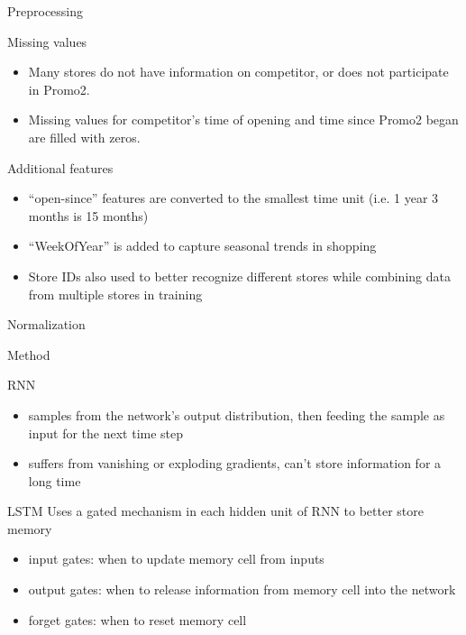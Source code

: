 \documentclass[10pt]{beamer}
\begin{document}
\begin{frame}{Preprocessing}
    \begin{alertblock}{Missing values}
        \begin{itemize}
            \item Many stores do not have information on competitor, or does not participate in Promo2.
            \item Missing values for competitor's time of opening and time since Promo2 began are filled with zeros.
        \end{itemize}
    \end{alertblock}

    \begin{alertblock}{Additional features}
        \begin{itemize}
            \item ``open-since'' features are converted to the smallest time unit (i.e. 1 year 3 months is 15 months)
            \item ``WeekOfYear'' is added to capture seasonal trends in shopping
            \item Store IDs also used to better recognize different stores while combining data from multiple stores in training
        \end{itemize}
    \end{alertblock}

    \begin{alertblock}{Normalization}
    \end{alertblock}
\end{frame}

\begin{frame}{Method}
    \begin{alertblock}{RNN}
        \begin{itemize}
            \item samples from the network’s output distribution, then feeding the sample as input for the next time step
            \item suffers from vanishing or exploding gradients, can't store information for a long time
        \end{itemize}
    \end{alertblock}
    \begin{alertblock}{LSTM}
        Uses a gated mechanism in each hidden unit of RNN to better store memory
        \begin{itemize}
            \item input gates: when to update memory cell from inputs
            \item output gates: when to release information from memory cell into the network
            \item forget gates: when to reset memory cell
        \end{itemize}
        
    \end{alertblock}
\end{frame}
\end{document}
